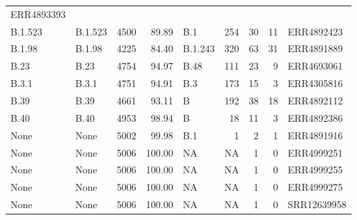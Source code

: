 \documentclass[
]{article}
\begin{document}
\begin{longtable}[]{@{}llrrlrrrl@{}}
ERR4893393\tabularnewline
B.1.523 & B.1.523 & 4500 & 89.89 & B.1 & 254 & 30 & 11 &
ERR4892423\tabularnewline
B.1.98 & B.1.98 & 4225 & 84.40 & B.1.243 & 320 & 63 & 31 &
ERR4891889\tabularnewline
B.23 & B.23 & 4754 & 94.97 & B.48 & 111 & 23 & 9 &
ERR4693061\tabularnewline
B.3.1 & B.3.1 & 4751 & 94.91 & B.3 & 173 & 15 & 3 &
ERR4305816\tabularnewline
B.39 & B.39 & 4661 & 93.11 & B & 192 & 38 & 18 &
ERR4892112\tabularnewline
B.40 & B.40 & 4953 & 98.94 & B & 18 & 11 & 3 & ERR4892386\tabularnewline
None & None & 5002 & 99.98 & B.1 & 1 & 2 & 1 & ERR4891916\tabularnewline
None & None & 5006 & 100.00 & NA & NA & 1 & 0 &
ERR4999251\tabularnewline
None & None & 5006 & 100.00 & NA & NA & 1 & 0 &
ERR4999255\tabularnewline
None & None & 5006 & 100.00 & NA & NA & 1 & 0 &
ERR4999275\tabularnewline
None & None & 5006 & 100.00 & NA & NA & 1 & 0 &
SRR12639958\tabularnewline
\bottomrule
\end{longtable}

\normalsize

\renewcommand\refname{Bibliography}
  
\end{document}
